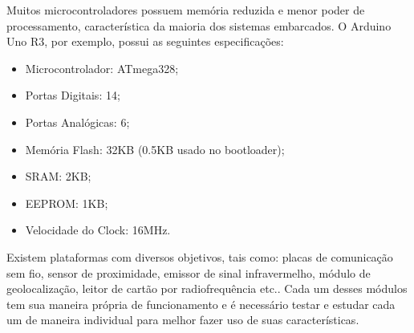 \documentclass[12pt]{uftpibicsic2018}
\begin{document}
%
%

Muitos microcontroladores possuem memória reduzida e menor poder de processamento, característica da maioria dos sistemas embarcados. O Arduino Uno R3, por exemplo, possui as seguintes especificações:

\begin{itemize}
\item Microcontrolador: ATmega328;
\item Portas Digitais: 14;
\item Portas Analógicas: 6;
\item Memória Flash: 32KB (0.5KB usado no bootloader);
\item SRAM: 2KB;
\item EEPROM: 1KB;
\item Velocidade do Clock: 16MHz.
\end{itemize}



Existem plataformas com diversos objetivos, tais como: placas de comunicação sem fio, sensor de proximidade, emissor de sinal infravermelho, módulo de geolocalização, leitor de cartão por radiofrequência etc.\cite{Hintz:1992:MAP:573880}. Cada um desses módulos tem sua maneira própria de funcionamento e é necessário testar e estudar cada um de maneira individual para melhor fazer uso de suas características.
\end{document}
